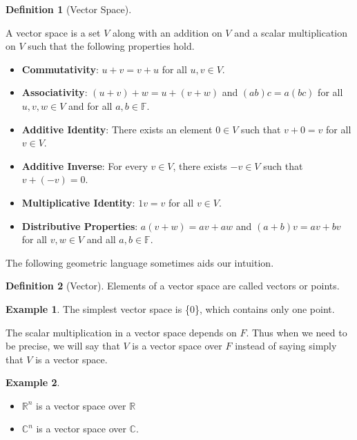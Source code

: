 \documentclass[
]{book}
\providecommand{\tightlist}{%
  \setlength{\itemsep}{0pt}\setlength{\parskip}{0pt}}
\theoremstyle{definition}
\newtheorem{definition}{Definition}[chapter]
\theoremstyle{definition}
\newtheorem{example}{Example}[chapter]
\theoremstyle{definition}
\theoremstyle{definition}
\theoremstyle{remark}
\begin{document}
\begin{definition}[Vector Space]
\protect\hypertarget{def:unnamed-chunk-15}{}\label{def:unnamed-chunk-15}

A vector space is a set \(V\) along with an addition on \(V\) and a scalar multiplication on \(V\) such that the following properties hold.

\begin{itemize}
\tightlist
\item
  \textbf{Commutativity}: \(u + v = v + u\) for all \(u, v \in V\).
\item
  \textbf{Associativity}: \((u + v) + w = u + (v + w)\) and \((ab)c = a(bc)\) for all \(u, v, w \in V\) and for all \(a, b \in \mathbb{F}\).
\item
  \textbf{Additive Identity}: There exists an element \(0 \in V\) such that \(v + 0 = v\) for all \(v \in V\).
\item
  \textbf{Additive Inverse}: For every \(v \in V\), there exists \(-v \in V\) such that \(v + (-v) = 0\).
\item
  \textbf{Multiplicative Identity}: \(1v = v\) for all \(v \in V\).
\item
  \textbf{Distributive Properties}: \(a(v + w) = av + aw\) and \((a + b)v = av + bv\) for all \(v, w \in V\) and all \(a, b \in \mathbb{F}\).
\end{itemize}

\end{definition}

The following geometric language sometimes aids our intuition.

\begin{definition}[Vector]
\protect\hypertarget{def:unnamed-chunk-16}{}\label{def:unnamed-chunk-16}Elements of a vector space are called vectors or points.
\end{definition}

\begin{example}
\protect\hypertarget{exm:unnamed-chunk-17}{}\label{exm:unnamed-chunk-17}The simplest vector space is \{0\}, which contains only one point.
\end{example}

The scalar multiplication in a vector space depends on \(F\).
Thus when we need to be precise, we will say that \(V\) is a vector space over \(F\) instead of saying simply that \(V\) is a vector space.

\begin{example}
\protect\hypertarget{exm:unnamed-chunk-18}{}\label{exm:unnamed-chunk-18}\leavevmode

\begin{itemize}
\tightlist
\item
  \(\mathbb{R}^n\) is a vector space over \(\mathbb{R}\)
\item
  \(\mathbb{C}^n\) is a vector space over \(\mathbb{C}\).
\end{itemize}

\end{example}
\end{document}
